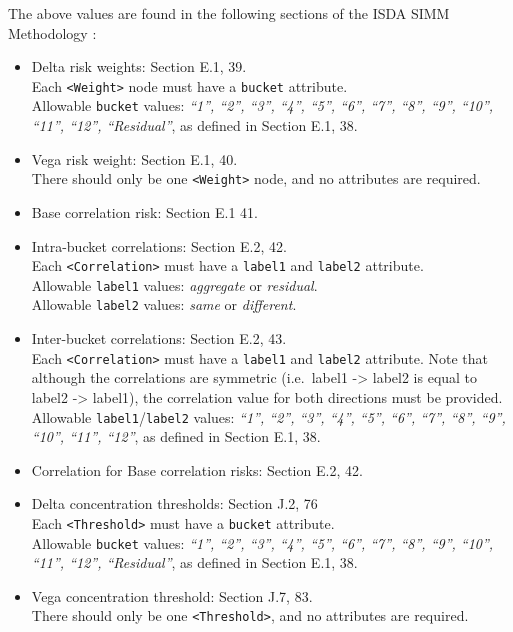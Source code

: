 The above values are found in the following sections of the ISDA SIMM Methodology \cite{SIMM2.6}:
\begin{itemize}
  \item Delta risk weights: Section E.1, 39. \\
    Each {\tt <Weight>} node must have a {\tt bucket} attribute.\\
    Allowable {\tt bucket} values: \emph{``1'', ``2'', ``3'', ``4'', ``5'', ``6'', ``7'', ``8'', ``9'', ``10'', ``11'', ``12'', ``Residual''}, as defined in Section E.1, 38.
  \item Vega risk weight: Section E.1, 40. \\
    There should only be one {\tt <Weight>} node, and no attributes are required.
  \item Base correlation risk: Section E.1 41.
  \item Intra-bucket correlations: Section E.2, 42. \\
    Each {\tt <Correlation>} must have a {\tt label1} and {\tt label2} attribute. \\
    Allowable {\tt label1} values: \emph{aggregate} or \emph{residual}. \\
    Allowable {\tt label2} values: \emph{same} or \emph{different}.
  \item Inter-bucket correlations: Section E.2, 43. \\
    Each {\tt <Correlation>} must have a {\tt label1} and {\tt label2} attribute. Note that although the correlations
    are symmetric (i.e.\ label1 -> label2 is equal to label2 -> label1), the correlation value for both directions must be
    provided. \\
    Allowable {\tt label1}/{\tt label2} values: \emph{``1'', ``2'', ``3'', ``4'', ``5'', ``6'', ``7'', ``8'', ``9'', ``10'', ``11'', ``12''}, as defined in Section E.1, 38.
  \item Correlation for Base correlation risks: Section E.2, 42.
  \item Delta concentration thresholds: Section J.2, 76 \\
    Each {\tt <Threshold>} must have a {\tt bucket} attribute. \\
    Allowable {\tt bucket} values: \emph{``1'', ``2'', ``3'', ``4'', ``5'', ``6'', ``7'', ``8'', ``9'', ``10'', ``11'', ``12'', ``Residual''}, as defined in Section E.1, 38.
  \item Vega concentration threshold: Section J.7, 83. \\
    There should only be one {\tt <Threshold>}, and no attributes are required.
\end{itemize}

